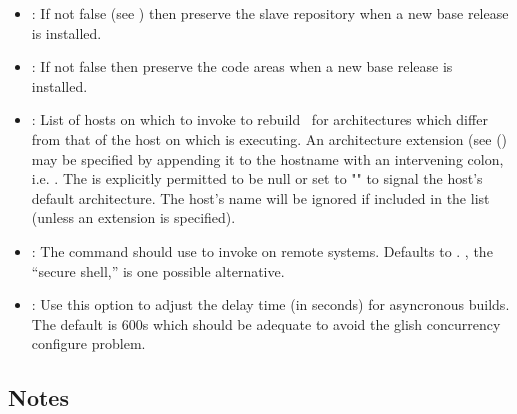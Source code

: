 \begin{itemize}
\item
   : If not false (see ) then
   preserve the slave repository when a new base release is installed.

\item
   : If not false then preserve the code areas
   when a new base release is installed.

\item
   : List of hosts on which to invoke
    to rebuild \aipspp\ for architectures which differ from
   that of the host on which  is executing.  An architecture
   extension (see () may be specified by appending it to the
   hostname with an intervening colon, i.e. .
   The  is explicitly permitted to be null or set to
   "\code{\_}" to signal the host's default architecture.  The 
   host's name will be ignored if included in the list (unless an extension is
   specified).

\item
   : The command  should use
   to invoke  on remote systems.  Defaults to
   .  , the ``secure shell,'' is one possible
   alternative.

\item
   : Use this option to adjust the delay time (in seconds)
   for asyncronous builds.  The default is 600s which should be adequate to 
   avoid the glish concurrency configure problem.

\end{itemize}

\subsection*{Notes}

